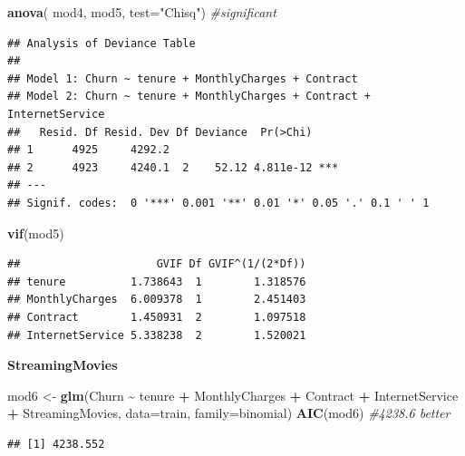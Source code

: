 \documentclass[
  twoside]{article}
\newenvironment{Shaded}{\begin{snugshade}}{\end{snugshade}}
\newcommand{\AttributeTok}[1]{\textcolor[rgb]{0.13,0.29,0.53}{#1}}
\newcommand{\CommentTok}[1]{\textcolor[rgb]{0.56,0.35,0.01}{\textit{#1}}}
\newcommand{\FunctionTok}[1]{\textcolor[rgb]{0.13,0.29,0.53}{\textbf{#1}}}
\newcommand{\NormalTok}[1]{#1}
\newcommand{\OtherTok}[1]{\textcolor[rgb]{0.56,0.35,0.01}{#1}}
\newcommand{\SpecialCharTok}[1]{\textcolor[rgb]{0.81,0.36,0.00}{\textbf{#1}}}
\newcommand{\StringTok}[1]{\textcolor[rgb]{0.31,0.60,0.02}{#1}}
\begin{document}
\begin{Shaded}
\begin{Highlighting}[]
\FunctionTok{anova}\NormalTok{( mod4, mod5,  }\AttributeTok{test=}\StringTok{"Chisq"}\NormalTok{) }\CommentTok{\#significant}
\end{Highlighting}
\end{Shaded}

\begin{verbatim}
## Analysis of Deviance Table
## 
## Model 1: Churn ~ tenure + MonthlyCharges + Contract
## Model 2: Churn ~ tenure + MonthlyCharges + Contract + InternetService
##   Resid. Df Resid. Dev Df Deviance  Pr(>Chi)    
## 1      4925     4292.2                          
## 2      4923     4240.1  2    52.12 4.811e-12 ***
## ---
## Signif. codes:  0 '***' 0.001 '**' 0.01 '*' 0.05 '.' 0.1 ' ' 1
\end{verbatim}

\begin{Shaded}
\begin{Highlighting}[]
\FunctionTok{vif}\NormalTok{(mod5)}
\end{Highlighting}
\end{Shaded}

\begin{verbatim}
##                     GVIF Df GVIF^(1/(2*Df))
## tenure          1.738643  1        1.318576
## MonthlyCharges  6.009378  1        2.451403
## Contract        1.450931  2        1.097518
## InternetService 5.338238  2        1.520021
\end{verbatim}

\textbf{StreamingMovies}

\begin{Shaded}
\begin{Highlighting}[]
\NormalTok{mod6 }\OtherTok{\textless{}{-}} \FunctionTok{glm}\NormalTok{(Churn }\SpecialCharTok{\textasciitilde{}}\NormalTok{ tenure }\SpecialCharTok{+}\NormalTok{ MonthlyCharges }\SpecialCharTok{+}\NormalTok{ Contract }\SpecialCharTok{+}\NormalTok{ InternetService }\SpecialCharTok{+} 
\NormalTok{              StreamingMovies, }\AttributeTok{data=}\NormalTok{train, }\AttributeTok{family=}\NormalTok{binomial)}
\FunctionTok{AIC}\NormalTok{(mod6) }\CommentTok{\#4238.6 better}
\end{Highlighting}
\end{Shaded}

\begin{verbatim}
## [1] 4238.552
\end{verbatim}
\end{document}
